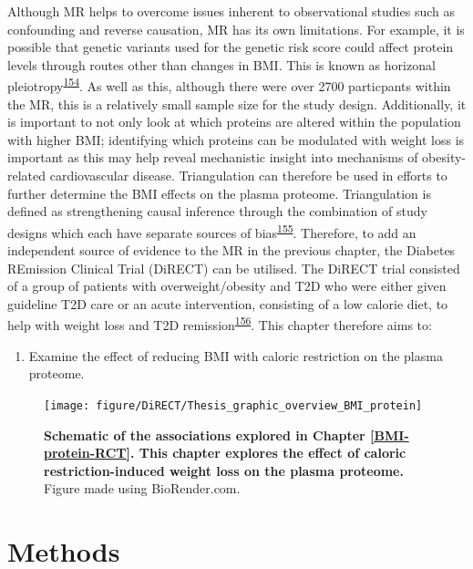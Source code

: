 \documentclass[11pt,twoside]{bristolthesis}
\providecommand{\tightlist}{%
  \setlength{\itemsep}{0pt}\setlength{\parskip}{0pt}}
\begin{document}
Although MR helps to overcome issues inherent to observational studies such as confounding and reverse causation, MR has its own limitations. For example, it is possible that genetic variants used for the genetic risk score could affect protein levels through routes other than changes in BMI. This is known as horizonal pleiotropy\textsuperscript{\protect\hyperlink{ref-Davies2018}{154}}. As well as this, although there were over 2700 particpants within the MR, this is a relatively small sample size for the study design. Additionally, it is important to not only look at which proteins are altered within the population with higher BMI; identifying which proteins can be modulated with weight loss is important as this may help reveal mechanistic insight into mechanisms of obesity-related cardiovascular disease. Triangulation can therefore be used in efforts to further determine the BMI effects on the plasma proteome. Triangulation is defined as strengthening causal inference through the combination of study designs which each have separate sources of bias\textsuperscript{\protect\hyperlink{ref-Lawlor2016}{155}}. Therefore, to add an independent source of evidence to the MR in the previous chapter, the Diabetes REmission Clinical Trial (DiRECT) can be utilised. The DiRECT trial consisted of a group of patients with overweight/obesity and T2D who were either given guideline T2D care or an acute intervention, consisting of a low calorie diet, to help with weight loss and T2D remission\textsuperscript{\protect\hyperlink{ref-Lean2018}{156}}. This chapter therefore aims to:
\begin{enumerate}
\def\labelenumi{\arabic{enumi})}
\tightlist
\item
  Examine the effect of reducing BMI with caloric restriction on the plasma proteome.
\end{enumerate}


\begin{figure}
\texttt{[image: figure/DiRECT/Thesis\_graphic\_overview\_BMI\_protein]} \caption[Schematic of the associations explored in Chapter \ref{BMI-protein-RCT}]{\textbf{Schematic of the associations explored in Chapter \ref{BMI-protein-RCT}. This chapter explores the effect of caloric restriction-induced weight loss on the plasma proteome.} Figure made using BioRender.com.}\label{fig:BMI-protein-graphic2}
\end{figure}
\hypertarget{methods-3}{%
\section{Methods}\label{methods-3}}
\end{document}
